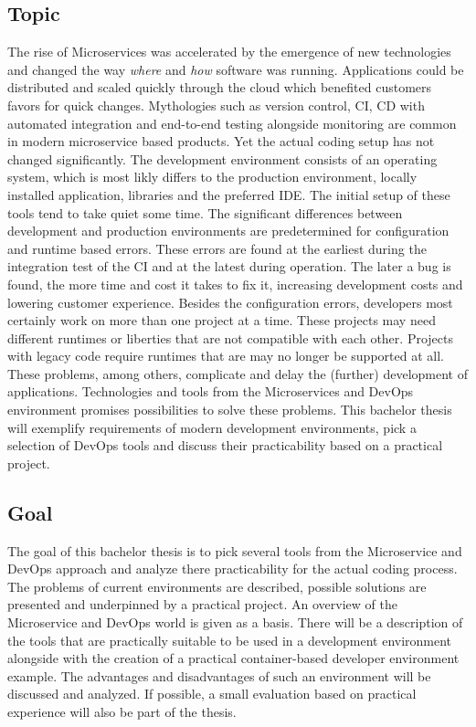 \documentclass[12pt, a4paper]{article}
\begin{document}
\subsection{Topic}
The rise of Microservices was accelerated by the emergence of new technologies and changed the way \textit{where} and \textit{how} software was running. Applications could be distributed and scaled quickly through the cloud which benefited customers favors for quick changes. Mythologies such as version control, \ac*{CI}, \ac*{CD} with automated integration and end-to-end testing alongside monitoring are common in modern microservice based products. Yet the actual coding setup has not changed significantly. The development environment consists of an operating system, which is most likly differs to the production environment, locally installed application, libraries and the preferred \ac{IDE}. The initial setup of these tools tend to take quiet some time. The significant differences between development and production environments are predetermined for configuration and runtime based errors. These errors are found at the earliest during the integration test of the CI and at the latest during operation. The later a bug is found, the more time and cost it takes to fix it, increasing development costs and lowering customer experience.\newline
Besides the configuration errors, developers most certainly work on more than one project at a time. These projects may need different runtimes or liberties that are not compatible with each other. Projects with legacy code require runtimes that are may no longer be supported at all.\newline
These problems, among others, complicate and delay the (further) development of applications. Technologies and tools from the Microservices and DevOps environment promises possibilities to solve these problems. This bachelor thesis will exemplify requirements of modern development environments, pick a selection of DevOps tools and discuss their practicability based on a practical project.
\subsection{Goal}
The goal of this bachelor thesis is to pick several tools from the Microservice and DevOps approach and analyze there practicability for the actual coding process. The problems of current environments are described, possible solutions are presented and underpinned by a practical project.  An overview of the Microservice and DevOps world is given as a basis. There will be a description of the tools that are practically suitable to be used in a development environment alongside with the creation of a practical container-based developer environment example. The advantages and disadvantages of such an environment will be discussed and analyzed. If possible, a small evaluation based on practical experience will also be part of the thesis.
\end{document}
